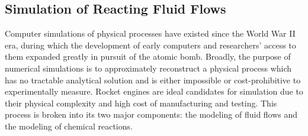 \subsection{Simulation of Reacting Fluid Flows}

Computer simulations of physical processes have existed since the World War II era, during which the development of early computers and researchers' access to them expanded greatly in pursuit of the atomic bomb. Broadly, the purpose of numerical simulations is to approximately reconstruct a physical process which has no tractable analytical solution and is either impossible or cost-prohibitive to experimentally measure. Rocket engines are ideal candidates for simulation due to their physical complexity and high cost of manufacturing and testing. This process is broken into its two major components: the modeling of fluid flows and the modeling of chemical reactions.

